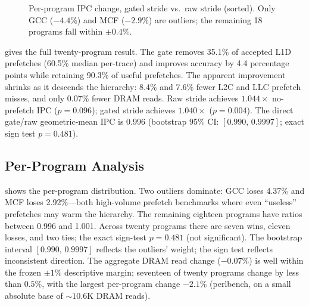 \documentclass[conference]{IEEEtran}
\begin{document}
\begin{figure}[t]
\centering
{}
\caption{Per-program IPC change, gated stride vs.\ raw stride (sorted).
Only GCC ($-4.4\%$) and MCF ($-2.9\%$) are outliers; the remaining 18
programs fall within ${\pm}0.4\%$.}
\label{fig:champsim_ipc}
\end{figure}

 gives the full twenty-program result. The gate removes
35.1\% of accepted L1D prefetches (60.5\% median per-trace) and improves
accuracy by 4.4 percentage points while retaining 90.3\% of useful
prefetches. The apparent improvement shrinks as it descends the hierarchy:
8.4\% and 7.6\% fewer L2C and LLC prefetch misses, and only 0.07\% fewer
DRAM reads. Raw stride achieves $1.044\times$ no-prefetch IPC ($p = 0.096$);
gated stride achieves $1.040\times$ ($p = 0.004$). The direct gate/raw
geometric-mean IPC is $0.996$ (bootstrap 95\% CI: $[0.990,\,0.9997]$; exact
sign test $p = 0.481$).

\subsection{Per-Program Analysis}

 shows the per-program distribution. Two outliers
dominate: GCC loses 4.37\% and MCF loses 2.92\%---both high-volume prefetch
benchmarks where even ``useless'' prefetches may warm the hierarchy. The
remaining eighteen programs have ratios between 0.996 and 1.001. Across twenty
programs there are seven wins, eleven losses, and two ties; the exact
sign-test $p = 0.481$ (not significant). The bootstrap interval
$[0.990,\,0.9997]$ reflects the outliers' weight; the sign test reflects
inconsistent direction. The aggregate DRAM read change ($-0.07\%$) is well within the frozen
${\pm}1\%$ descriptive margin; seventeen of twenty programs change by
less than $0.5\%$, with the largest per-program change $-2.1\%$
(perlbench, on a small absolute base of ${\sim}10.6$K DRAM reads).
\end{document}
